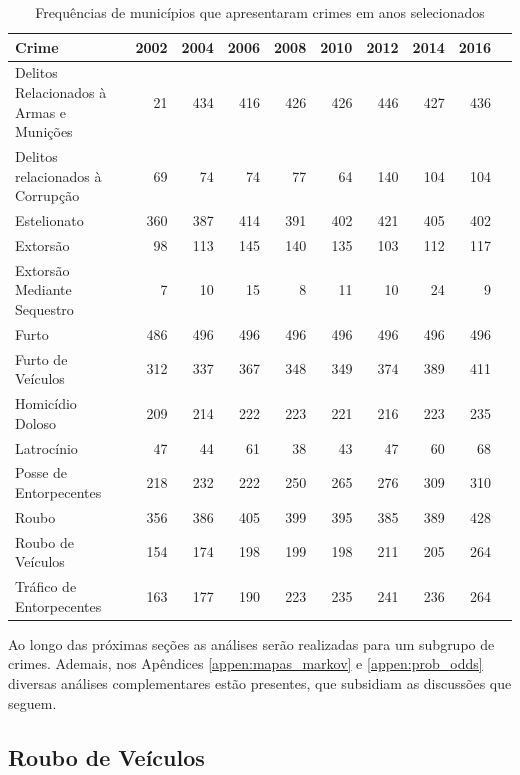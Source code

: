 \documentclass[12pt,openright,oneside,a4paper,english,french,spanish]{abntex2}
\numberwithin{table}{section} %
\numberwithin{figure}{section} %
\begin{document}
\begin{table}[H]
\begin{tiny}
\centering
\begin{tabular}{lrrrrrrrrr}
  \hline
Crime & 2002 & 2004 & 2006 & 2008 & 2010 & 2012 & 2014 & 2016 \\ 
  \hline
Delitos Relacionados à Armas e Munições & 21 & 434 & 416 & 426 & 426 & 446 & 427 & 436 \\ 
Delitos relacionados à Corrupção & 69 & 74 & 74 & 77 & 64 & 140 & 104 & 104 \\ 
Estelionato & 360 & 387 & 414 & 391 & 402 & 421 & 405 & 402 \\ 
Extorsão & 98 & 113 & 145 & 140 & 135 & 103 & 112 & 117 \\ 
Extorsão Mediante Sequestro & 7 & 10 & 15 & 8 & 11 & 10 & 24 & 9 \\ 
Furto & 486 & 496 & 496 & 496 & 496 & 496 & 496 & 496 \\ 
Furto de Veículos & 312 & 337 & 367 & 348 & 349 & 374 & 389 & 411 \\ 
Homicídio Doloso & 209 & 214 & 222 & 223 & 221 & 216 & 223 & 235 \\ 
Latrocínio & 47 & 44 & 61 & 38 & 43 & 47 & 60 & 68 \\ 
Posse de Entorpecentes & 218 & 232 & 222 & 250 & 265 & 276 & 309 & 310 \\ 
Roubo & 356 & 386 & 405 & 399 & 395 & 385 & 389 & 428 \\ 
Roubo de Veículos & 154 & 174 & 198 & 199 & 198 & 211 & 205 & 264 \\ 
Tráfico de Entorpecentes & 163 & 177 & 190 & 223 & 235 & 241 & 236 & 264 \\ 
   \hline
\end{tabular}
    \caption{Frequências de municípios que apresentaram crimes em anos selecionados}
    \label{tab:freq_mun_crime_markov}
\end{tiny}
\end{table}

Ao longo das próximas seções as análises serão realizadas para um subgrupo de crimes. Ademais, nos Apêndices \ref{appen:mapas_markov} e \ref{appen:prob_odds} diversas análises complementares estão presentes, que subsidiam as discussões que seguem.

\subsection{Roubo de Veículos\label{sec:roubo_de_veiculos_acoplamento}}
\end{document}
